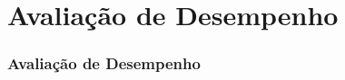 \section[Avaliação de Desempenho]{Avaliação de Desempenho}
\begin{frame}
\frametitle{Avaliação de Desempenho}
\end{frame}

